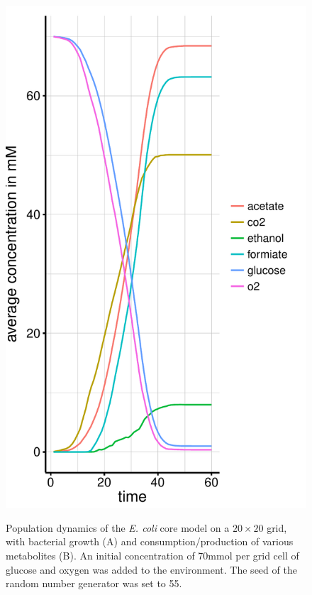 \begin{figure}[h!]
{    \includegraphics[scale=0.45]{../results/img/ecoli_20x20_aerob_seed55_subs.pdf}
  }
  \caption{Population dynamics of the \emph{E. coli} core model on a $20\times20$ grid, with bacterial growth (A) and consumption/production of various metabolites (B). An initial concentration of 70\;mmol per grid cell of glucose and oxygen was added to the environment. The seed of the random number generator was set to 55.}
\label{fig:ecoresg}
\end{figure}

